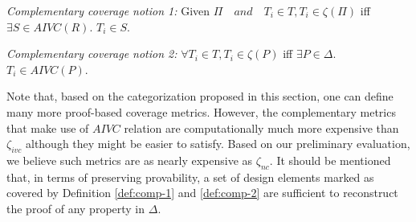 \begin{definition} {\emph{Complementary coverage notion 1:}}
  \label{def:comp-1}
   Given $ \Pi \quad and \quad T_i \in T,  T_i \in \zeta(\Pi)$ iff $ \exists S
   \in AIVC(R)$. $T_i \in S$.
\end{definition}

\begin{definition} {\emph{Complementary coverage notion 2:}}
  \label{def:comp-2}
   $\forall T_i \in T,  T_i \in \zeta(P)$ iff $\exists P \in \Delta$. $T_i \in AIVC(P)$.
\end{definition}

Note that, based on the categorization proposed in this section, one can define many more proof-based coverage metrics. However, the complementary metrics that make use of $AIVC$ relation are computationally much more expensive than $\zeta_{ivc}$ although they might be easier to satisfy. Based on our preliminary evaluation, we believe such metrics are as nearly expensive as $\zeta_{nc}$. It should be mentioned that, in terms of preserving provability, a set of design elements marked as covered by Definition \ref{def:comp-1} and \ref{def:comp-2} are
sufficient to reconstruct the proof of any property in $\Delta$.

